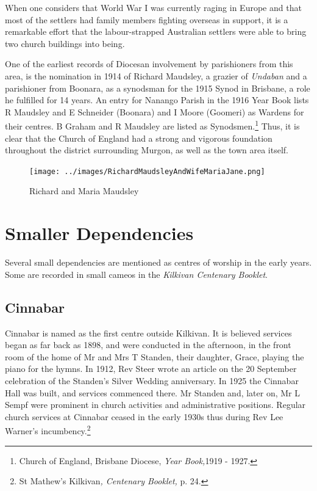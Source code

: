 When one considers that World War I was currently raging in Europe and that most of the settlers had family members fighting overseas in support, it is a remarkable effort that the labour-strapped Australian settlers were able to bring two church buildings into being.



One of the earliest records of Diocesan involvement by parishioners from this area, is the nomination in 1914 of Richard Maudsley, a grazier of \emph{Undaban} and a parishioner from Boonara, as a synodsman for the 1915 Synod in Brisbane, a role he fulfilled for 14 years. An entry for Nanango Parish in the 1916 Year Book lists R Maudsley and E Schneider (Boonara) and I Moore (Goomeri) as Wardens for their centres. B Graham and R Maudsley are listed as Synodsmen.\footnote{Church of England, Brisbane Diocese, \emph{Year Book,}1919 - 1927.} Thus, it is clear that the Church of England had a strong and vigorous foundation throughout the district surrounding Murgon, as well as the town area itself.








\begin{figure}
\begin{center}
\texttt{[image: ../images/RichardMaudsleyAndWifeMariaJane.png]}
\caption{Richard and Maria Maudsley}
\end{center}
\end{figure}




\section{Smaller Dependencies}



Several small dependencies are mentioned as centres of worship in the early years. Some are recorded in small cameos in the \emph{Kilkivan Centenary Booklet}.



\subsection{Cinnabar}



Cinnabar is named as the first centre outside Kilkivan. It is believed services began as far back as 1898, and were conducted in the afternoon, in the front room of the home of Mr and Mrs T Standen, their daughter, Grace, playing the piano for the hymns. In 1912, Rev Steer wrote an article on the 20 September celebration of the Standen's Silver Wedding anniversary. In 1925 the Cinnabar Hall was built, and services commenced there. Mr Standen and, later on, Mr L Sempf were prominent in church activities and administrative positions. Regular church services at Cinnabar ceased in the early 1930s thus during Rev Lee Warner's incumbency.\footnote{St Mathew's Kilkivan\emph{, Centenary Booklet,} p. 24.}


